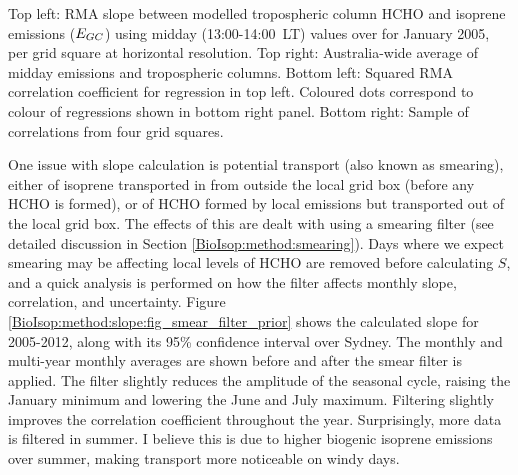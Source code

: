     
    { %
      Top left: RMA slope between modelled tropospheric column HCHO and isoprene emissions ($E_{GC}$) using midday (13:00-14:00~LT) values over for January 2005, per grid square at \lowhr horizontal resolution.
      Top right: Australia-wide average of midday emissions and tropospheric columns.
      Bottom left: Squared RMA correlation coefficient for regression in top left. Coloured dots correspond to colour of regressions shown in bottom right panel.
      Bottom right: Sample of correlations from four grid squares.
    }
    {\label{BioIsop:method:slope:fig_regressions}}
    
    
    One issue with slope calculation is potential transport (also known as smearing), either of isoprene transported in from outside the local grid box (before any HCHO is formed), or of HCHO formed by local emissions but transported out of the local grid box.
    The effects of this are dealt with using a smearing filter (see detailed discussion in Section \ref{BioIsop:method:smearing}).
    Days where we expect smearing may be affecting local levels of HCHO are removed before calculating $S$, and a quick analysis is performed on how the filter affects monthly slope, correlation, and uncertainty.
    Figure \ref{BioIsop:method:slope:fig_smear_filter_prior} shows the calculated slope for 2005-2012, along with its 95\% confidence interval over Sydney.
    The monthly and multi-year monthly averages are shown before and after the smear filter is applied.
    The filter slightly reduces the amplitude of the seasonal cycle, raising the January minimum and lowering the June and July maximum.
    Filtering slightly improves the correlation coefficient throughout the year.
    Surprisingly, more data is filtered in summer.
    I believe this is due to higher biogenic isoprene emissions over summer, making transport more noticeable on windy days.
